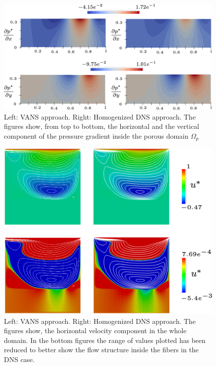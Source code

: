\begin{figure}[H]
	\centering
	\includegraphics[width=1\linewidth]{chapter_5/figure/re1000/vans_p}
	\caption{Left: VANS approach. Right: Homogenized DNS approach. The figures show, from top to bottom, the horizontal and the vertical component of the pressure gradient inside the porous domain $\Omega_p$}
	\label{fig:1000_p}
\end{figure}

\begin{figure}
	\centering
	\includegraphics[width=0.9\linewidth]{chapter_5/figure/re_100_big/ux}
	\caption{Left: VANS approach. Right: Homogenized DNS approach. The figures show, the horizontal velocity component in the whole domain. In the bottom figures the range of values plotted has been reduced to better show the flow structure inside the fibers in the DNS case.}
	\label{fig:ux}
\end{figure}


